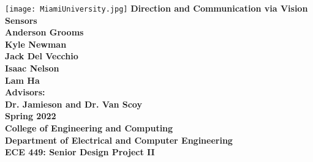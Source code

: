 \documentclass{report}
\begin{document}
\begin{titlepage}
    \centering
    \texttt{[image: MiamiUniversity.jpg]}
    \vskip0.5cm
    {\bfseries\Large
        Direction and Communication via Vision Sensors\\
        \vskip0.5cm
        Anderson Grooms\\
        Kyle Newman\\
        Jack Del Vecchio\\
        Isaac Nelson\\
        Lam Ha\\
        \vskip0.5cm
        Advisors:\\
        Dr. Jamieson and Dr. Van Scoy\\
        \vskip0.5cm
        Spring 2022\\
        College of Engineering and Computing\\
        Department of Electrical and Computer Engineering\\
        ECE 449: Senior Design Project II\\
    }    
    \vfill
    \vfill
\end{titlepage}
\end{document}
